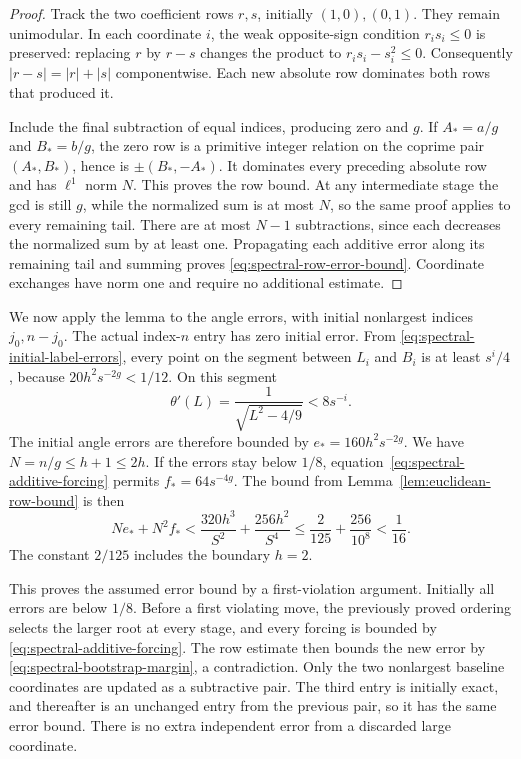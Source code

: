 \begin{proof}
Track the two coefficient rows $r,s$, initially $(1,0),(0,1)$.
They remain unimodular. In each coordinate $i$, the weak opposite-sign
condition $r_i s_i\leqslant0$ is preserved: replacing $r$ by $r-s$
changes the product to $r_i s_i-s_i^2\leqslant0$.
Consequently $|r-s|=|r|+|s|$ componentwise. Each new absolute row
dominates both rows that produced it.

Include the final subtraction of equal indices, producing zero and
$g$. If $A_*=a/g$ and $B_*=b/g$, the zero row is a primitive
integer relation on the coprime pair $(A_*,B_*)$, hence is
$\pm(B_*,-A_*)$. It dominates every preceding absolute row and has
$\ell^1$ norm $N$. This proves the row bound.
At any intermediate stage the gcd is still $g$, while the normalized
sum is at most $N$, so the same proof applies to every remaining tail.
There are at most $N-1$ subtractions, since each decreases the normalized
sum by at least one. Propagating each additive error along its remaining
tail and summing proves \eqref{eq:spectral-row-error-bound}.
Coordinate exchanges have norm one and require no additional estimate.
\end{proof}

We now apply the lemma to the angle errors, with initial nonlargest
indices $j_0,n-j_0$. The actual index-$n$ entry has zero initial
error. From \eqref{eq:spectral-initial-label-errors}, every point on
the segment between $L_i$ and $B_i$ is at least $s^i/4$, because
$20h^2s^{-2g}<1/12$. On this segment
$$
 \theta'(L)=\frac1{\sqrt{L^2-4/9}}<8s^{-i}.
$$
The initial angle errors are therefore bounded by
$e_*=160h^2s^{-2g}$. We have $N=n/g\leqslant h+1\leqslant2h$.
If the errors stay below $1/8$, equation~\eqref{eq:spectral-additive-forcing}
permits $f_*=64s^{-4g}$. The bound from
Lemma~\ref{lem:euclidean-row-bound} is then
\begin{equation}\label{eq:spectral-bootstrap-margin}
 Ne_*+N^2f_*
 <\frac{320h^3}{S^2}+\frac{256h^2}{S^4}
 \leqslant\frac2{125}+\frac{256}{10^8}<\frac1{16}.
\end{equation}
The constant $2/125$ includes the boundary $h=2$.

This proves the assumed error bound by a first-violation argument.
Initially all errors are below $1/8$. Before a first violating move,
the previously proved ordering selects the larger root at every stage,
and every forcing is bounded by \eqref{eq:spectral-additive-forcing}.
The row estimate then bounds the new error by
\eqref{eq:spectral-bootstrap-margin}, a contradiction. Only the two
nonlargest baseline coordinates are updated as a subtractive pair.
The third entry is initially exact, and thereafter is an unchanged
entry from the previous pair, so it has the same error bound. There is
no extra independent error from a discarded large coordinate.

